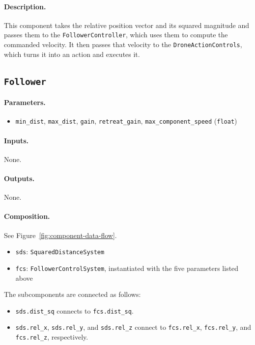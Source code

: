 \documentclass{article}
\begin{document}
\paragraph{Description.} This component takes the relative position vector and its squared magnitude and passes them to the \texttt{FollowerController}, which uses them to compute the commanded velocity. It then passes that velocity to the \texttt{DroneActionControls}, which turns it into an action and executes it.

\subsection{\texttt{Follower}}

\paragraph{Parameters.}
\begin{itemize}
    \item \verb|min_dist|, \verb|max_dist|, \verb|gain|,
          \verb|retreat_gain|, \verb|max_component_speed| (\verb|float|)
\end{itemize}

\paragraph{Inputs.} None.

\paragraph{Outputs.} None.

\paragraph{Composition.}
See Figure~\ref{fig:component-data-flow}.
\begin{itemize}
    \item \verb|sds|: \verb|SquaredDistanceSystem|
    \item \verb|fcs|: \verb|FollowerControlSystem|, instantiated with the five
          parameters listed above
\end{itemize}
The subcomponents are connected as follows:
\begin{itemize}
    \item \verb|sds.dist_sq| connects to \verb|fcs.dist_sq|.
    \item \verb|sds.rel_x|, \verb|sds.rel_y|, and \verb|sds.rel_z| connect to
          \verb|fcs.rel_x|, \verb|fcs.rel_y|, and \verb|fcs.rel_z|,
          respectively.
\end{itemize}
\end{document}

